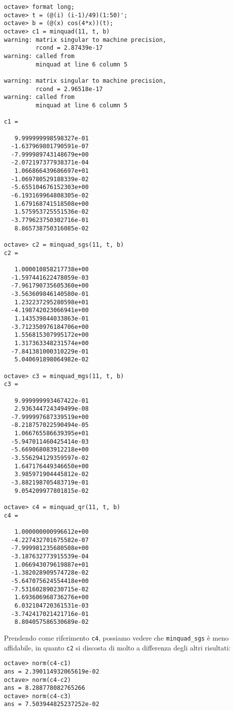 \begin{lstlisting}[numbers=none, language={}]
octave> format long;
octave> t = (@(i) (i-1)/49)(1:50)';
octave> b = (@(x) cos(4*x))(t);
octave> c1 = minquad(11, t, b)
warning: matrix singular to machine precision,
         rcond = 2.87439e-17
warning: called from
         minquad at line 6 column 5

warning: matrix singular to machine precision,
         rcond = 2.96518e-17
warning: called from
         minquad at line 6 column 5

c1 =

   9.999999998598327e-01
  -1.637969801790591e-07
  -7.999989743148679e+00
  -2.072197377938371e-04
   1.066866439686697e+01
  -1.069780529188339e-02
  -5.655104676152303e+00
  -6.193169964808305e-02
   1.679168741518508e+00
   1.575953725551536e-02
  -3.779623750302716e-01
   8.865738750316085e-02

octave> c2 = minquad_sgs(11, t, b)
c2 =

   1.000010858217738e+00
  -1.597441622478059e-03
  -7.961790735605360e+00
  -3.563609846140580e-01
   1.232237295280598e+01
  -4.198742023066941e+00
   1.143539844033863e-01
  -3.712350976184706e+00
   1.556815307995172e+00
   1.317363348231574e+00
  -7.841381000310229e-01
   5.040691898064982e-02

octave> c3 = minquad_mgs(11, t, b)
c3 =

   9.999999993467422e-01
   2.936344724349499e-08
  -7.999997687339519e+00
  -8.218757022590494e-05
   1.066765586639395e+01
  -5.947011460425414e-03
  -5.669068083912218e+00
  -3.556294129359597e-02
   1.647176449346650e+00
   3.985971904445812e-02
  -3.882198705483719e-01
   9.054209977801815e-02

octave> c4 = minquad_qr(11, t, b)
c4 =

   1.000000000996612e+00
  -4.227432701675582e-07
  -7.999981235680508e+00
  -3.187632773915539e-04
   1.066943079619887e+01
  -1.382028909574728e-02
  -5.647075624554418e+00
  -7.531602890230715e-02
   1.693606968736276e+00
   6.032104720361531e-03
  -3.742417021421716e-01
   8.804057586530689e-02
\end{lstlisting}

Prendendo come riferimento \lstinline£c4£, possiamo vedere che \lstinline£minquad_sgs£ è meno affidabile, in quanto \lstinline£c2£ si discosta di molto a differenza degli altri risultati:

\begin{lstlisting}[numbers=none, language={}]
octave> norm(c4-c1)
ans = 2.390114932065619e-02
octave> norm(c4-c2)
ans = 8.288778082765266
octave> norm(c4-c3)
ans = 7.503944825237252e-02
\end{lstlisting}

